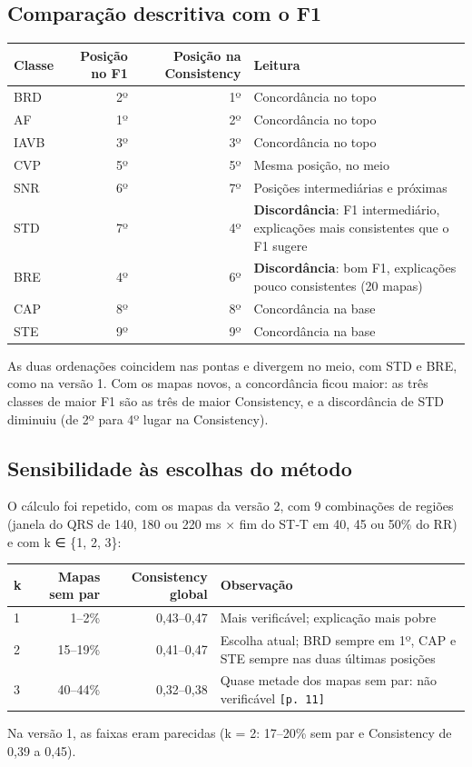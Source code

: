 \documentclass[11pt,a4paper]{article}
\begin{document}
\subsection{Comparação descritiva com o F1}
\begin{center}\small
\begin{tabularx}{\linewidth}{lrrX}
\toprule
\textbf{Classe} & \textbf{Posição no F1} & \textbf{Posição na Consistency} & \textbf{Leitura} \\
\midrule
BRD & 2º & 1º & Concordância no topo \\
AF & 1º & 2º & Concordância no topo \\
IAVB & 3º & 3º & Concordância no topo \\
CVP & 5º & 5º & Mesma posição, no meio \\
SNR & 6º & 7º & Posições intermediárias e próximas \\
STD & 7º & 4º & \textbf{Discordância}: F1 intermediário, explicações mais consistentes que o F1 sugere \\
BRE & 4º & 6º & \textbf{Discordância}: bom F1, explicações pouco consistentes (20 mapas) \\
CAP & 8º & 8º & Concordância na base \\
STE & 9º & 9º & Concordância na base \\
\bottomrule
\end{tabularx}
\end{center}

As duas ordenações coincidem nas pontas e divergem no meio, com STD e BRE, como na versão 1. Com os mapas novos, a concordância ficou maior: as três classes de maior F1 são as três de maior Consistency, e a discordância de STD diminuiu (de 2º para 4º lugar na Consistency).

\subsection{Sensibilidade às escolhas do método}
O cálculo foi repetido, com os mapas da versão 2, com 9 combinações de regiões (janela do QRS de 140, 180 ou 220 ms × fim do ST‑T em 40, 45 ou 50\% do RR) e com k ∈ \{1, 2, 3\}:

\begin{center}\small
\begin{tabularx}{\linewidth}{lrrX}
\toprule
\textbf{k} & \textbf{Mapas sem par} & \textbf{Consistency global} & \textbf{Observação} \\
\midrule
1 & 1–2\% & 0,43–0,47 & Mais verificável; explicação mais pobre \\
2 & 15–19\% & 0,41–0,47 & Escolha atual; BRD sempre em 1º, CAP e STE sempre nas duas últimas posições \\
3 & 40–44\% & 0,32–0,38 & Quase metade dos mapas sem par: não verificável \texttt{[p. 11]} \\
\bottomrule
\end{tabularx}
\end{center}
Na versão 1, as faixas eram parecidas (k = 2: 17–20\% sem par e Consistency de 0,39 a 0,45).
\end{document}
